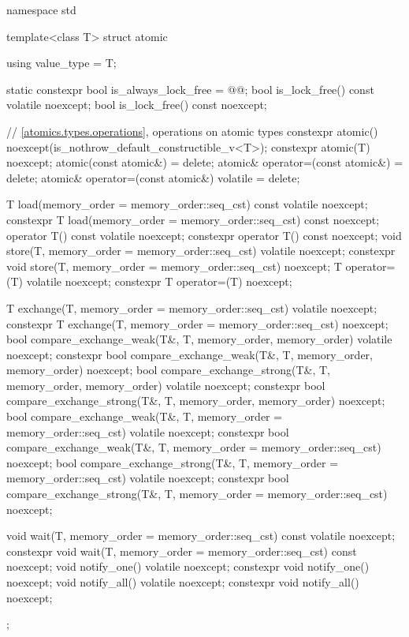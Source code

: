 %
%
\begin{codeblock}
namespace std {
  template<class T> struct atomic {
    using value_type = T;

    static constexpr bool is_always_lock_free = @@;
    bool is_lock_free() const volatile noexcept;
    bool is_lock_free() const noexcept;

    // \ref{atomics.types.operations}, operations on atomic types
    constexpr atomic() noexcept(is_nothrow_default_constructible_v<T>);
    constexpr atomic(T) noexcept;
    atomic(const atomic&) = delete;
    atomic& operator=(const atomic&) = delete;
    atomic& operator=(const atomic&) volatile = delete;

    T load(memory_order = memory_order::seq_cst) const volatile noexcept;
    constexpr T load(memory_order = memory_order::seq_cst) const noexcept;
    operator T() const volatile noexcept;
    constexpr operator T() const noexcept;
    void store(T, memory_order = memory_order::seq_cst) volatile noexcept;
    constexpr void store(T, memory_order = memory_order::seq_cst) noexcept;
    T operator=(T) volatile noexcept;
    constexpr T operator=(T) noexcept;

    T exchange(T, memory_order = memory_order::seq_cst) volatile noexcept;
    constexpr T exchange(T, memory_order = memory_order::seq_cst) noexcept;
    bool compare_exchange_weak(T&, T, memory_order, memory_order) volatile noexcept;
    constexpr bool compare_exchange_weak(T&, T, memory_order, memory_order) noexcept;
    bool compare_exchange_strong(T&, T, memory_order, memory_order) volatile noexcept;
    constexpr bool compare_exchange_strong(T&, T, memory_order, memory_order) noexcept;
    bool compare_exchange_weak(T&, T, memory_order = memory_order::seq_cst) volatile noexcept;
    constexpr bool compare_exchange_weak(T&, T, memory_order = memory_order::seq_cst) noexcept;
    bool compare_exchange_strong(T&, T, memory_order = memory_order::seq_cst) volatile noexcept;
    constexpr bool compare_exchange_strong(T&, T, memory_order = memory_order::seq_cst) noexcept;

    void wait(T, memory_order = memory_order::seq_cst) const volatile noexcept;
    constexpr void wait(T, memory_order = memory_order::seq_cst) const noexcept;
    void notify_one() volatile noexcept;
    constexpr void notify_one() noexcept;
    void notify_all() volatile noexcept;
    constexpr void notify_all() noexcept;
  };
}
\end{codeblock}

